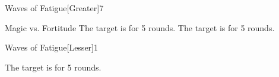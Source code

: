 \begin{spellsection}{Waves of Fatigue}[Greater]{7}
    \begin{spellheader}
    \end{spellheader}
    \begin{spellcontent}
        \begin{spelltargetinginfo}
        \end{spelltargetinginfo}
        \begin{spelleffects}
            \begin{spellattack}{Magic vs. Fortitude}
                \spellsuccess The target is \exhausted for 5 rounds.
                \spellfailure The target is \fatigued for 5 rounds.
            \end{spellattack}
        \end{spelleffects}
    \end{spellcontent}
    \begin{spellfooter}
        \miscastexplode
    \end{spellfooter}
\end{spellsection}

\begin{spellsection}{Waves of Fatigue}[Lesser]{1}
    \begin{spellheader}
    \end{spellheader}
    \begin{spellcontent}
        \begin{spelltargetinginfo}
        \end{spelltargetinginfo}
        \begin{spelleffects}
            \spelleffect The target is \fatigued for 5 rounds.
        \end{spelleffects}
    \end{spellcontent}
    \begin{spellfooter}
        \miscastexplode
    \end{spellfooter}
\end{spellsection}

